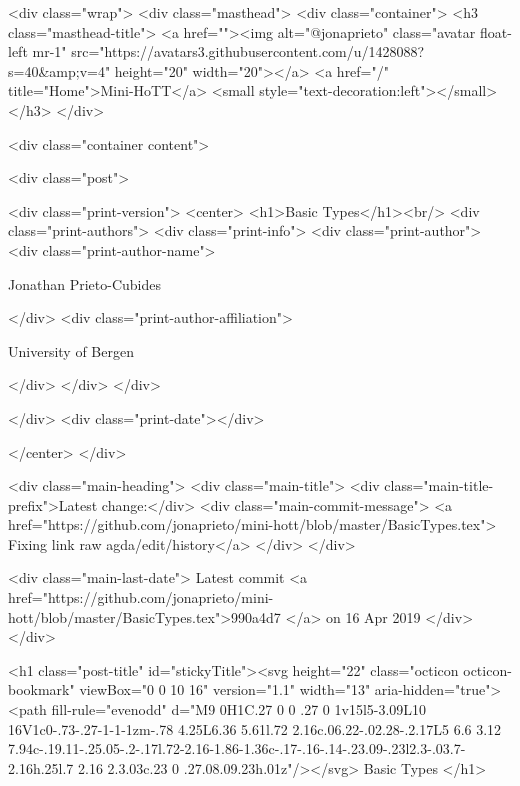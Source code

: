     <div class="wrap">
      <div class="masthead">
        <div class="container">
          <h3 class="masthead-title">
            <a href=""><img alt="@jonaprieto" class="avatar float-left mr-1" src="https://avatars3.githubusercontent.com/u/1428088?s=40&amp;v=4" height="20" width="20"></a>
            <a href="/" title="Home">Mini-HoTT</a>
            <small style="text-decoration:left"></small>
          </h3>
        </div>
      
      <div class="container content">
        







<div class="post">

  <div class="print-version">
    <center>
      <h1>Basic Types</h1><br/>
        <div class="print-authors">
          <div class="print-info">
            <div class="print-author">
              <div class="print-author-name">
                
                  Jonathan Prieto-Cubides
                
              </div>
              <div class="print-author-affiliation">
                
                  University of Bergen
                
                </div>
            </div>
          </div>
          
          
        </div>
        <div class="print-date"></div>
        
        
    </center>
  </div>

  
  <div class="main-heading">
    <div class="main-title">
      <div class="main-title-prefix">Latest change:</div>
      <div class="main-commit-message">
            <a href="https://github.com/jonaprieto/mini-hott/blob/master/BasicTypes.tex">
              Fixing link raw agda/edit/history</a>
      </div>
    </div>

    <div class="main-last-date">
      Latest commit <a href="https://github.com/jonaprieto/mini-hott/blob/master/BasicTypes.tex">990a4d7 </a> on  16 Apr 2019
    </div>
  </div>
  
  <h1 class="post-title" id="stickyTitle"><svg height="22" class="octicon octicon-bookmark" viewBox="0 0 10 16" version="1.1" width="13" aria-hidden="true"><path fill-rule="evenodd" d="M9 0H1C.27 0 0 .27 0 1v15l5-3.09L10 16V1c0-.73-.27-1-1-1zm-.78 4.25L6.36 5.61l.72 2.16c.06.22-.02.28-.2.17L5 6.6 3.12 7.94c-.19.11-.25.05-.2-.17l.72-2.16-1.86-1.36c-.17-.16-.14-.23.09-.23l2.3-.03.7-2.16h.25l.7 2.16 2.3.03c.23 0 .27.08.09.23h.01z"/></svg> Basic Types
  </h1>


